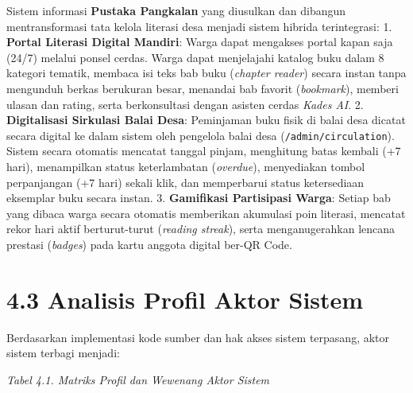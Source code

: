 \documentclass[
  indonesian,
  12pt,
]{report}
\begin{document}
Sistem informasi \textbf{Pustaka Pangkalan} yang diusulkan dan dibangun
mentransformasi tata kelola literasi desa menjadi sistem hibrida
terintegrasi: 1. \textbf{Portal Literasi Digital Mandiri}: Warga dapat
mengakses portal kapan saja (24/7) melalui ponsel cerdas. Warga dapat
menjelajahi katalog buku dalam 8 kategori tematik, membaca isi teks bab
buku (\emph{chapter reader}) secara instan tanpa mengunduh berkas
berukuran besar, menandai bab favorit (\emph{bookmark}), memberi ulasan
dan rating, serta berkonsultasi dengan asisten cerdas \emph{Kades AI}.
2. \textbf{Digitalisasi Sirkulasi Balai Desa}: Peminjaman buku fisik di
balai desa dicatat secara digital ke dalam sistem oleh pengelola balai
desa (\texttt{/admin/circulation}). Sistem secara otomatis mencatat
tanggal pinjam, menghitung batas kembali (+7 hari), menampilkan status
keterlambatan (\emph{overdue}), menyediakan tombol perpanjangan (+7
hari) sekali klik, dan memperbarui status ketersediaan eksemplar buku
secara instan. 3. \textbf{Gamifikasi Partisipasi Warga}: Setiap bab yang
dibaca warga secara otomatis memberikan akumulasi poin literasi,
mencatat rekor hari aktif berturut-turut (\emph{reading streak}), serta
menganugerahkan lencana prestasi (\emph{badges}) pada kartu anggota
digital ber-QR Code.

\section{4.3 Analisis Profil Aktor
Sistem}\label{analisis-profil-aktor-sistem}

Berdasarkan implementasi kode sumber dan hak akses sistem terpasang,
aktor sistem terbagi menjadi:

\emph{Tabel 4.1. Matriks Profil dan Wewenang Aktor Sistem}
\end{document}
